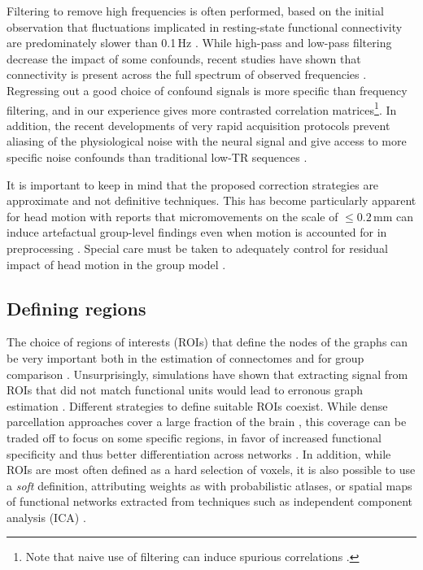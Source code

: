 \documentclass[5p]{elsarticle}
\begin{document}
Filtering to remove high frequencies is often performed, based on the initial
observation that fluctuations implicated in resting-state functional
connectivity are predominately slower than 0.1\,Hz \cite{cordes2001,biswal1995}.
While high-pass and low-pass filtering decrease the impact of some confounds,
recent studies have shown that connectivity is present across the
full spectrum of observed frequencies \cite{smith2012,vanoort2012}. Regressing
out a good choice of confound signals is more specific than frequency
filtering,
and in our experience gives more contrasted correlation matrices\footnote{Note
	that naive use of filtering can induce spurious correlations
	\cite{davey2012}.}.
In addition, the recent developments of very rapid acquisition 
protocols prevent aliasing of the physiological noise with the neural 
signal and give access to more specific noise confounds than traditional
low-TR sequences \cite{boyaciouglu2012}.


It is important to keep in mind that the proposed correction strategies
are approximate and not definitive techniques. This has become particularly
apparent for head motion with reports that micromovements on the scale
of $\le 0.2$\,mm can induce artefactual group-level findings even when motion is
accounted for in preprocessing
\cite{vandijk2012,power2011,satterthwaite2013}. Special care must be taken to
adequately control for residual impact of head motion in the group model
\cite{satterthwaite2013,vandijk2012}.

%

\subsection{Defining regions}

The choice of regions of interests (ROIs) that define the nodes of the
graphs can be very important both in the estimation of connectomes and
for group comparison \cite{wang2009}. Unsurprisingly, simulations have
shown that extracting signal from ROIs that did not match functional
units would lead to erronous graph estimation \cite{smith2011}.
%
Different strategies to define suitable ROIs coexist. While dense 
parcellation approaches cover
a large fraction of the brain \cite{achard2006, varoquaux2010c,
wang2009,bellec2006,craddock2012}, this coverage can be traded off to focus on some specific
regions, in favor of increased functional specificity and thus better
differentiation across networks \cite{greicius2003, dosenbach2006,
varoquaux2010b}. In addition, while
ROIs are most often defined as a hard selection of voxels, it is also
possible to use a \emph{soft} definition, attributing weights as with
probabilistic atlases, or spatial maps of functional networks extracted
from techniques such as independent component analysis (ICA) \cite{kiviniemi2009,smith2012}.
\end{document}
